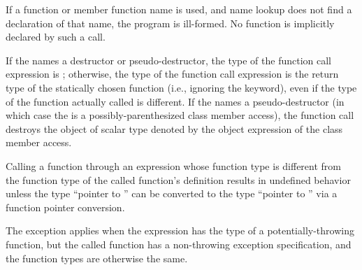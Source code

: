 \pnum
\begin{note}
If a function or member function name is used, and name
lookup does not find a declaration of that name,
the program is ill-formed. No function is implicitly declared by such a
call.
\end{note}

\pnum
If the  names
a destructor or pseudo-destructor,
the type of the function call expression is ; otherwise, the
type of the function call expression is the return type of the
statically chosen function (i.e., ignoring the  keyword),
even if the type of the function actually called is different.
%
If the  names a pseudo-destructor
(in which case the 
is a possibly-parenthesized class member access),
the function call destroys
the object of scalar type
denoted by the object expression
of the class member access.

\pnum
Calling a function through an
expression whose function type  is different
from the function type  of the called function's
definition results in undefined behavior
unless the type ``pointer to '' can be converted
to the type ``pointer to '' via a function pointer conversion.
\begin{note}
The exception applies when the expression has the type of a
potentially-throwing function, but the called function has
a non-throwing exception specification,
and the function types are otherwise the same.
\end{note}

